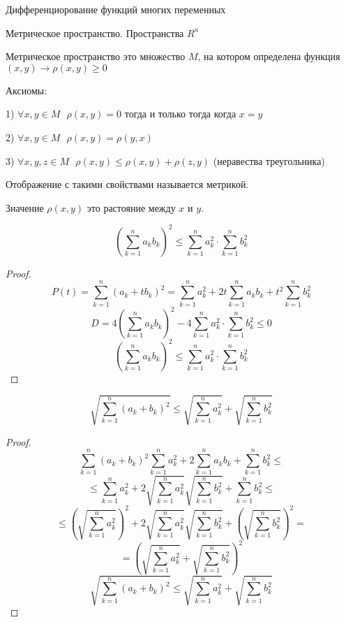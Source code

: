 \begin{title}
  Дифференциорование функций многих переменных
\end{title}

\begin{title}[\Large]
  Метрическое пространство. Пространства $R^n$
\end{title}

\begin{define}
  Метрическое пространство это множество $M$, на котором определена функция
  $(x, y) \to \rho(x, y) \ge 0$

  Аксиомы:

  1) $\forall x,y \in M ~~~ \rho(x,y) = 0$ тогда и только тогда когда $x = y$

  2) $\forall x,y \in M ~~~ \rho(x,y) =\rho(y,x)$

  3) $\forall x,y,z \in M ~~~ \rho(x,y) \le \rho(x,y) + \rho(z,y)$
  (неравества треугольника)

  Отображение с такими свойствами называется метрикой.

  Значение $\rho(x,y)$ это растояние между $x$ и $y$.
\end{define}

\begin{block}
  $$
  \left( \sum_{k=1}^n a_k b_k \right)^2 \le \sum_{k=1}^n a_k^2 \cdot
  \sum_{k=1}^n b_k^2
  $$
\end{block}

\begin{proof}
  $$
  P(t) = \sum_{k=1}^n (a_k + t b_k)^2 = \sum_{k=1}^n a_k^2 +
  2t\sum_{k=1}^n a_k b_k + t^2 \sum_{k=1}^n b_k^2
  $$
  $$
  D = 4\left( \sum_{k=1}^n a_k b_k \right)^2 - 4\sum_{k=1}^n a_k^2 \cdot
  \sum_{k=1}^n b_k^2 \le 0
  $$
  $$
  \left( \sum_{k=1}^n a_k b_k \right)^2 \le \sum_{k=1}^n a_k^2 \cdot
  \sum_{k=1}^n b_k^2
  $$
\end{proof}

\begin{block}
  $$
  \sqrt{\sum_{k=1}^n (a_k + b_k)^2} \le \sqrt{\sum_{k=1}^n a_k^2} +
  \sqrt{\sum_{k=1}^n b_k^2}
  $$
\end{block}

\begin{proof}
  $$
  \sum_{k=1}^n (a_k + b_k)^2 \sum_{k=1}^n a_k^2 +
  2\sum_{k=1}^n a_k b_k + \sum_{k=1}^n b_k^2 \le
  $$
  $$
  \le \sum_{k=1}^n a_k^2 + 2\sqrt{\sum_{k=1}^n a_k^2} \sqrt{\sum_{k=1}^n b_k^2}
  + \sum_{k=1}^n b_k^2 \le
  $$
  $$
  \le \left( \sqrt{\sum_{k=1}^n a_k^2} \right)^2 + 2\sqrt{\sum_{k=1}^n a_k^2}
  \sqrt{\sum_{k=1}^n b_k^2} + \left( \sqrt{\sum_{k=1}^n b_k^2} \right)^2 =
  $$
  $$
  = \left( \sqrt{\sum_{k=1}^n a_k^2} + \sqrt{\sum_{k=1}^n b_k^2} \right)^2
  $$
  $$
  \sqrt{\sum_{k=1}^n (a_k + b_k)^2} \le \sqrt{\sum_{k=1}^n a_k^2} +
  \sqrt{\sum_{k=1}^n b_k^2}
  $$
\end{proof}

